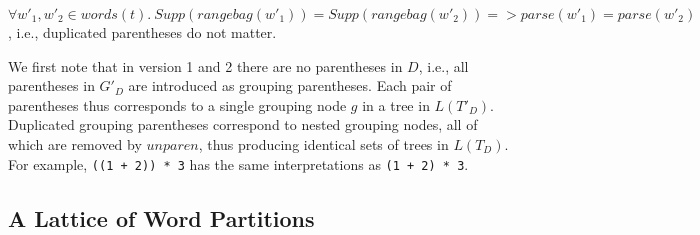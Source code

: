 \documentclass[acmsmall,review,anonymous]{acmart}\settopmatter{printfolios=true,printccs=false,printacmref=false}
\newcommand{\support}{\mathit{Supp}}
\newcommand{\semantic}{\mathit{unparen}} %
\newcommand{\parse}{\mathit{parse}} %
\newcommand{\words}{\mathit{words}} %
\newcommand{\alt}{\mathit{alt}} %
\newcommand{\rangebag}{\mathit{rangebag}} %
\begin{document}
\begin{lemma}
  $\forall w'_1, w'_2 \in \words(t).\ \support(\rangebag(w'_1)) = \support(\rangebag(w'_2)) => \parse(w'_1) = \parse(w'_2)$, i.e., duplicated parentheses do not matter.
  \label{lemma:rangeset-equality}
\end{lemma}
\noindent We first note that in version 1 and 2 there are no parentheses in $D$, i.e., all parentheses in $G'_D$ are introduced as grouping parentheses. Each pair of parentheses thus corresponds to a single grouping node $g$ in a tree in $L(T'_D)$. Duplicated grouping parentheses correspond to nested grouping nodes, all of which are removed by $\semantic$, thus producing identical sets of trees in $L(T_D)$. For example, \verb|((1 + 2)) * 3| has the same interpretations as \verb|(1 + 2) * 3|.

\subsection{A Lattice of Word Partitions} \label{sec:lattice}
\end{document}
